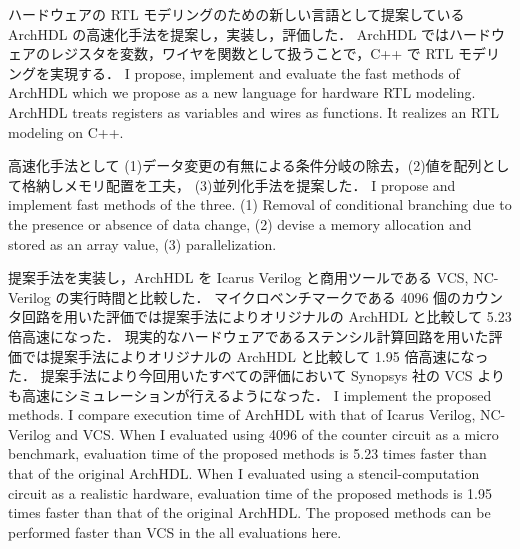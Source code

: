 ハードウェアの RTL モデリングのための新しい言語として提案している ArchHDL の高速化手法を提案し，実装し，評価した．
ArchHDL ではハードウェアのレジスタを変数，ワイヤを関数として扱うことで，C++ で RTL モデリングを実現する．
\fi
I propose, implement and evaluate the fast methods of ArchHDL which we propose as a new language for hardware RTL modeling.
ArchHDL treats registers as variables and wires as functions.
It realizes an RTL modeling on C++.

高速化手法として (1)データ変更の有無による条件分岐の除去，(2)値を配列として格納しメモリ配置を工夫，
(3)並列化手法を提案した．
\fi
I propose and implement fast methods of the three.
(1) Removal of conditional branching due to the presence or absence of data change,
(2) devise a memory allocation and stored as an array value,
(3) parallelization.

提案手法を実装し，ArchHDL を Icarus Verilog と商用ツールである VCS, NC-Verilog の実行時間と比較した．
マイクロベンチマークである 4096 個のカウンタ回路を用いた評価では提案手法によりオリジナルの ArchHDL と比較して 5.23 倍高速になった．
現実的なハードウェアであるステンシル計算回路を用いた評価では提案手法によりオリジナルの ArchHDL と比較して 1.95 倍高速になった．
提案手法により今回用いたすべての評価において Synopsys 社の VCS よりも高速にシミュレーションが行えるようになった．
\fi
I implement the proposed methods. I compare execution time of ArchHDL with that of Icarus Verilog, NC-Verilog and VCS.
When I evaluated using 4096 of the counter circuit as a micro benchmark,
evaluation time of the proposed methods is 5.23 times faster than that of the original ArchHDL.
When I evaluated using a stencil-computation circuit as a realistic hardware,
evaluation time of the proposed methods is 1.95 times faster than that of the original ArchHDL.
The proposed methods can be performed faster than VCS in the all evaluations here.
